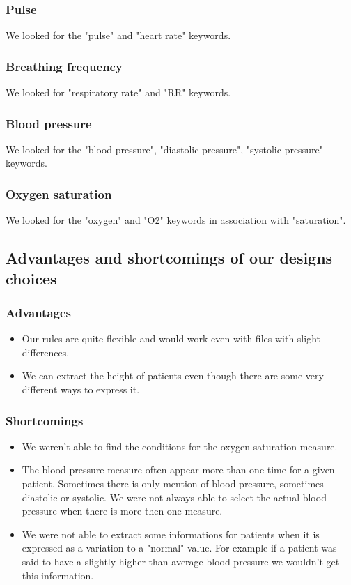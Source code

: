 \documentclass{eplDoc}
\begin{document}
\subsubsection{Pulse}

We looked for the "pulse" and "heart rate" keywords. 

\subsubsection{Breathing frequency}

We looked for "respiratory rate" and "RR" keywords. 

\subsubsection{Blood pressure}

We looked for the "blood pressure", "diastolic pressure", "systolic pressure" keywords.

\subsubsection{Oxygen saturation}

We looked for the "oxygen" and "O2" keywords in association with "saturation". 



\subsection{Advantages and shortcomings of our designs choices}
\subsubsection{Advantages}
\begin{itemize}
	\item Our rules are quite flexible and would work even with files with slight differences.
	\item We can extract the height of patients even though there are some very different ways to express it.
\end{itemize}
\subsubsection{Shortcomings}
\begin{itemize}
	\item We weren't able to find the conditions for the oxygen saturation measure. 
	\item The blood pressure measure  often appear more than one time for a given patient. Sometimes there is only mention of blood pressure, sometimes diastolic or systolic. We were not always able to select the actual blood pressure when there is more then one measure. 
	\item We were not able to extract some informations for patients when it is expressed as a variation to a "normal" value. For example if a patient was said to have a slightly higher than average blood pressure we wouldn't get this information. 
\end{itemize}
\end{document}
